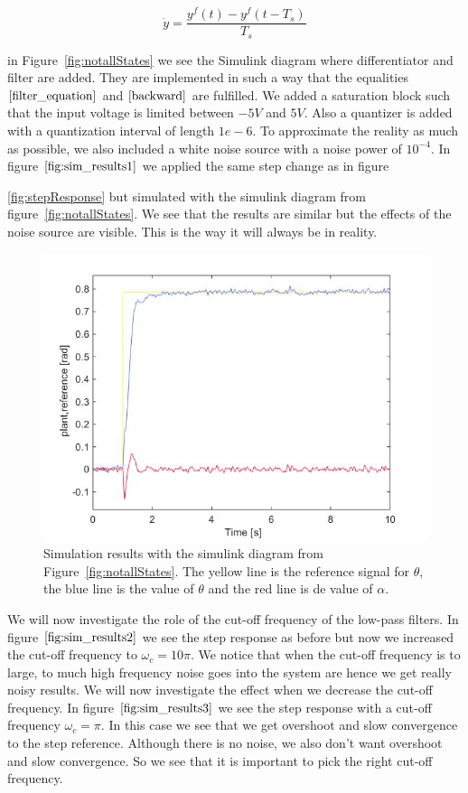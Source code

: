 \documentclass[ twoside,openright,titlepage,numbers=noenddot,headinclude,%
                footinclude=true,cleardoublepage=empty,abstractoff, %
                BCOR=5mm,paper=a4,fontsize=11pt,%
                ngerman,american,%
                ]{scrreprt}
\begin{document}
\begin{equation} \label{backward}
\dot{y} = \frac{y^f(t) - y^f(t - T_s)}{T_s}
\end{equation}

in Figure~\ref{fig:notallStates} we see the Simulink diagram where differentiator and filter are added. They are implemented in such a way that the equalities $\eqref{filter_equation}$ and $\eqref{backward}$ are fulfilled. We added a saturation block such that the input voltage is limited between $-5V$ and $5V$. Also a quantizer is added with a quantization interval of length $1e-6$. To approximate the reality as much as possible, we also included a white noise source with a noise power of $10^{-4}$. In figure $\eqref{fig:sim_results1}$ we applied the same step change as in figure~{\ref{fig:stepResponse} but simulated with the simulink diagram from figure~\ref{fig:notallStates}. We see that the results are similar but the effects of the noise source are visible. This is the way it will always be in reality.

\begin{figure}
\includegraphics[scale=0.5]{images/sim_results1}
\caption{Simulation results with the simulink diagram from Figure~\ref{fig:notallStates}. The yellow line is the reference signal for $\theta$, the blue line is the value of $\theta$ and the red line is de value of $\alpha$. }
\label{fig:sim_results1}
\end{figure}

We will now investigate the role of the cut-off frequency of the low-pass filters. In figure $\eqref{fig:sim_results2}$ we see the step response as before but now we increased the cut-off frequency to $\omega_c = 10 \pi$. We notice that when the cut-off frequency is to large, to much high frequency noise goes into the system are hence we get really noisy results. We will now investigate the effect when we decrease the cut-off frequency. In figure $\eqref{fig:sim_results3}$ we see the step response with a cut-off frequency $\omega_c = \pi$. In this case we see that we get overshoot and slow convergence to the step reference. Although there is no noise, we also don't want overshoot and slow convergence. So we see that it is important to pick the right cut-off frequency.

}
\end{document}

